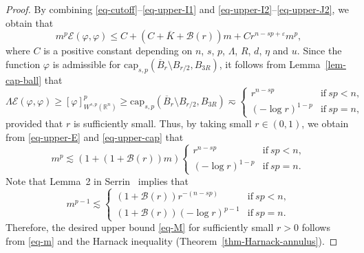 \documentclass[11pt]{amsart}
\theoremstyle{plain}
\theoremstyle{definition}
\numberwithin{equation}{section}
\begin{document}
\begin{proof}
By combining \eqref{eq-cutoff}--\eqref{eq-upper-I1} and \eqref{eq-upper-I2}--\eqref{eq-upper-J2}, we obtain that
\begin{equation}\label{eq-upper-E}
m^p \mathcal{E}(\varphi, \varphi) \leq C+(C+\overline{K}+\mathcal{B}(r))m+Cr^{n-sp+\varepsilon}m^p,
\end{equation}
where $C$ is a positive constant depending on $n$, $s$, $p$, $\Lambda$, $R$, $d$, $\eta$ and $u$. Since the function $\varphi$ is admissible for $\mathrm{cap}_{s, p}(\overline{B}_r \setminus B_{r/2}, B_{3R})$, it follows from Lemma~\ref{lem-cap-ball} that
\begin{equation}\label{eq-upper-cap}
\Lambda\mathcal{E}(\varphi, \varphi) \geq [\varphi]_{W^{s, p}(\mathbb{R}^n)}^p \geq \mathrm{cap}_{s, p}(\overline{B}_r \setminus B_{r/2}, B_{3R}) \eqsim
\begin{cases}
    r^{n-sp} &\text{if}~sp<n, \\
    (-\log r)^{1-p} &\text{if}~sp=n,
\end{cases}
\end{equation}
provided that $r$ is sufficiently small. Thus, by taking small $r \in (0,1)$, we obtain from \eqref{eq-upper-E} and \eqref{eq-upper-cap} that
\begin{equation*}
    m^p \lesssim \left( 1+(1+\mathcal{B}(r))m \right)
    \begin{cases}
    r^{n-sp} &\text{if}~sp<n, \\
    (-\log r)^{1-p} &\text{if}~sp=n.
\end{cases}
\end{equation*}
Note that Lemma~2 in Serrin~\cite{Ser64} implies that
\begin{equation}\label{eq-m}
m^{p-1} \lesssim
\begin{cases}
(1+\mathcal{B}(r))r^{-(n-sp)} &\text{if}~sp<n, \\
(1+\mathcal{B}(r))(-\log r)^{p-1} &\text{if}~sp=n.
\end{cases}
\end{equation}
Therefore, the desired upper bound \eqref{eq-M} for sufficiently small $r>0$ follows from \eqref{eq-m} and the Harnack inequality (Theorem~\ref{thm-Harnack-annulus}).


\end{proof}
\end{document}
